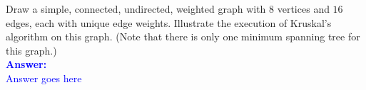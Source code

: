 \item{}
Draw a simple, connected, undirected, weighted graph with $8$ vertices and $16$
edges, each with unique edge weights. Illustrate the execution of Kruskal's
algorithm on this graph. (Note that there is only one minimum spanning tree for
this graph.)\\[12pt]
\ifanswers
\textcolor{blue}{
\textbf{Answer:}\\[6pt]
Answer goes here
}
\newpage
\fi
